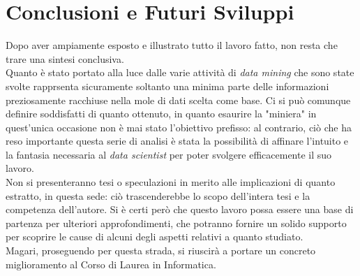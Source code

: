 \chapter{Conclusioni e Futuri Sviluppi}
\label{ch:fine}

Dopo aver ampiamente esposto e illustrato tutto il lavoro fatto, non resta che trare una sintesi conclusiva. \\

Quanto è stato portato alla luce dalle varie attività di \textit{data mining} che sono state svolte rapprsenta sicuramente soltanto una minima parte delle informazioni preziosamente racchiuse nella mole di dati scelta come base. Ci si può comunque definire soddisfatti di quanto ottenuto, in quanto esaurire la "miniera" in quest'unica occasione non è mai stato l'obiettivo prefisso: al contrario, ciò che ha reso importante questa serie di analisi è stata la possibilità di affinare l'intuito e la fantasia necessaria al \textit{data scientist} per poter svolgere efficacemente il suo lavoro.\\

Non si presenteranno tesi o speculazioni in merito alle implicazioni di quanto estratto, in questa sede: ciò trascenderebbe lo scopo dell'intera tesi e la competenza dell'autore. Si è certi però che questo lavoro possa essere una base di partenza per ulteriori approfondimenti, che potranno fornire un solido supporto per scoprire le cause di alcuni degli aspetti relativi a quanto studiato. \\

Magari, proseguendo per questa strada, si riuscirà a portare un concreto miglioramento al Corso di Laurea in Informatica.